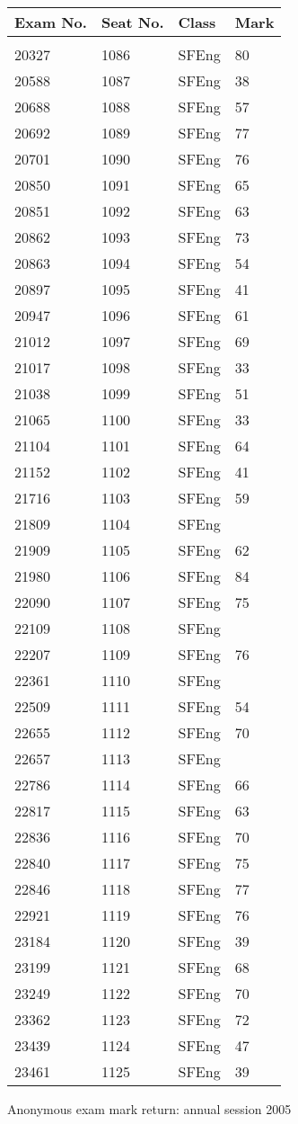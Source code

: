 \documentclass[a4paper]{article}
\begin{document}
\begin{tabular}{llll}
Exam No.&Seat No.&Class&Mark\\[3pt]
 \hline\\[3pt]
20327&1086&SFEng&80\\
20588&1087&SFEng&38\\
20688&1088&SFEng&57\\
20692&1089&SFEng&77\\
20701&1090&SFEng&76\\
20850&1091&SFEng&65\\
20851&1092&SFEng&63\\
20862&1093&SFEng&73\\
20863&1094&SFEng&54\\
20897&1095&SFEng&41\\
20947&1096&SFEng&61\\
21012&1097&SFEng&69\\
21017&1098&SFEng&33\\
21038&1099&SFEng&51\\
21065&1100&SFEng&33\\
21104&1101&SFEng&64\\
21152&1102&SFEng&41\\
21716&1103&SFEng&59\\
21809&1104&SFEng&\\
21909&1105&SFEng&62\\
21980&1106&SFEng&84\\
22090&1107&SFEng&75\\
22109&1108&SFEng&\\
22207&1109&SFEng&76\\
22361&1110&SFEng&\\
22509&1111&SFEng&54\\
22655&1112&SFEng&70\\
22657&1113&SFEng&\\
22786&1114&SFEng&66\\
22817&1115&SFEng&63\\
22836&1116&SFEng&70\\
22840&1117&SFEng&75\\
22846&1118&SFEng&77\\
22921&1119&SFEng&76\\
23184&1120&SFEng&39\\
23199&1121&SFEng&68\\
23249&1122&SFEng&70\\
23362&1123&SFEng&72\\
23439&1124&SFEng&47\\
23461&1125&SFEng&39\\
\end{tabular}
\newpage
\begin{center}
Anonymous exam mark return: annual session 2005
\end{center}
\end{document}
